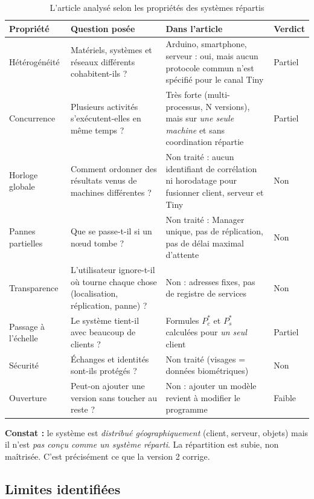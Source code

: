 \documentclass[11pt,a4paper]{article}
\begin{document}
\begin{table}[h]
\centering
\begin{tabular}{|p{2.7cm}|p{3.7cm}|p{6.3cm}|p{1.4cm}|}
\hline
\textbf{Propriété} & \textbf{Question posée} & \textbf{Dans l'article} & \textbf{Verdict} \\
\hline
Hétérogénéité & Matériels, systèmes et réseaux différents cohabitent-ils ? & Arduino, smartphone, serveur : oui, mais aucun protocole commun n'est spécifié pour le canal Tiny & Partiel \\
\hline
Concurrence & Plusieurs activités s'exécutent-elles en même temps ? & Très forte (multi-processus, N versions), mais sur \emph{une seule machine} et sans coordination répartie & Partiel \\
\hline
Horloge globale & Comment ordonner des résultats venus de machines différentes ? & Non traité : aucun identifiant de corrélation ni horodatage pour fusionner client, serveur et Tiny & Non \\
\hline
Pannes partielles & Que se passe-t-il si un nœud tombe ? & Non traité : Manager unique, pas de réplication, pas de délai maximal d'attente & Non \\
\hline
Transparence & L'utilisateur ignore-t-il où tourne chaque chose (localisation, réplication, panne) ? & Non : adresses fixes, pas de registre de services & Non \\
\hline
Passage à l'échelle & Le système tient-il avec beaucoup de clients ? & Formules $P^*_c$ et $P^*_s$ calculées pour \emph{un seul} client & Partiel \\
\hline
Sécurité & Échanges et identités sont-ils protégés ? & Non traité (visages = données biométriques) & Non \\
\hline
Ouverture & Peut-on ajouter une version sans toucher au reste ? & Non : ajouter un modèle revient à modifier le programme & Faible \\
\hline
\end{tabular}
\caption{L'article analysé selon les propriétés des systèmes répartis}
\end{table}

\textbf{Constat :} le système est \emph{distribué géographiquement} (client, serveur, objets) mais il n'est \emph{pas conçu comme un système réparti}. La répartition est subie, non maîtrisée. C'est précisément ce que la version 2 corrige.

\subsection{Limites identifiées}
\end{document}
